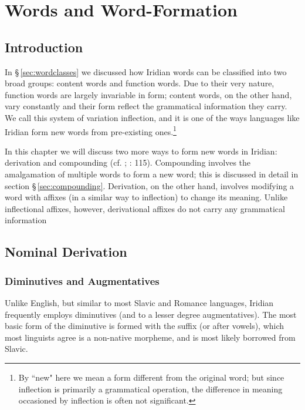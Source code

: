 \chapter{Words and Word-Formation}

\section{Introduction}

In \S\,\ref{sec:wordclasses} we discussed how Iridian words can be classified into two broad groups: content words and function words. Due to their very nature, function words are largely invariable in form; content words, on the other hand, vary constantly and their form reflect the grammatical information they carry. We call this system of variation {\sc inflection}, and it is one of the ways languages like Iridian form new words from pre-existing ones.\footnote{By ``new" here we mean a form different from the original word; but since inflection is primarily a grammatical operation, the difference in meaning occasioned by inflection is often not significant.}

In this chapter we will discuss two more ways to form new words in Iridian: {\sc derivation} and {\sc compounding} (cf. \cite{booij2005}; \cite{velupillai2012}: 115). Compounding involves the amalgamation of multiple words to form a new word; this is discussed in detail in section \S\,\ref{sec:compounding}. Derivation, on the other hand, involves modifying a word with affixes (in a similar way to inflection) to change its meaning. Unlike inflectional affixes, however, derivational affixes do not carry any grammatical information

\section{Nominal Derivation}
\subsection{Diminutives and Augmentatives}\label{sec:diminutive}

Unlike English, but similar to most Slavic and Romance languages, Iridian frequently employs {\sc diminutives} (and to a lesser degree {\sc augmentatives}). The most basic form of the diminutive is formed with the suffix  (or  after vowels), which most linguists agree is a non-native morpheme, and is most likely borrowed from Slavic.

